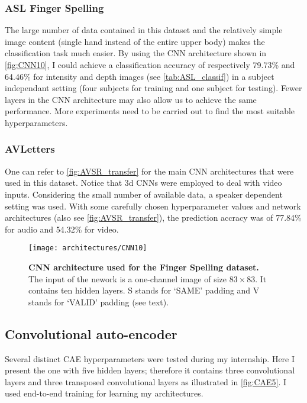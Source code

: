 \subsubsection{ASL Finger Spelling} \label{subsubsection:ASL_CNN}

The large number of data contained in this dataset and the relatively
simple image content (single hand instead of the entire upper body)
makes the classification task much easier. By using the CNN architecture
shown in \autoref{fig:CNN10}, I could achieve a classification accuracy
of respectively 79.73\% and 64.46\% for intensity and depth images
(see \autoref{tab:ASL_classif})
in a subject independant setting (four subjects for training and one
subject for testing). Fewer layers in the CNN architecture may also allow
us to achieve the same performance. More experiments need to be carried
out to find the most suitable hyperparameters.

\subsubsection{AVLetters}

One can refer to \autoref{fig:AVSR_transfer} for the main CNN architectures
that were used in this dataset. 
Notice that 3d CNNs were employed to deal with video inputs.
Considering the small number of available data, a speaker dependent
setting was used.
With some carefully chosen hyperparameter values and network architectures
(also see \autoref{fig:AVSR_transfer}),
the prediction accracy was of 77.84\% for audio and 54.32\% for video.

\begin{figure}[H]
  \centering
  \texttt{[image: architectures/CNN10]}
  \caption{%
    \textbf{CNN architecture used for the Finger Spelling  dataset.}
      \\[0.1em]
    The input of the nework is a one-channel image of size $83 \times 83$.
      It contains ten hidden layers. S stands for `SAME' padding
      and V stands for `VALID' padding (see text).}
  \label{fig:CNN10}
\end{figure}

\subsection{Convolutional auto-encoder} \label{subsection:CAE}

Several distinct CAE hyperparameters were tested during my internship.
Here I present the one with five hidden layers; therefore it contains
three convolutional layers and three transposed convolutional layers
as illustrated in \autoref{fig:CAE5}. I used end-to-end training for
learning my architectures.

